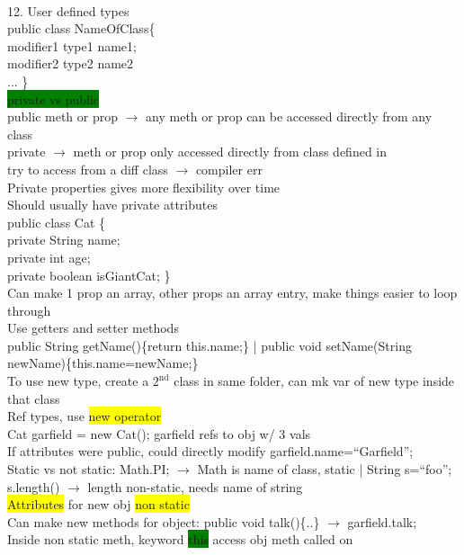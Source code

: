 ~\\ \color{NavyBlue}
12. User defined types
\\public class NameOfClass\{
\\ \phantom{abc}modifier1 type1 name1;
\\ \phantom{abc}modifier2 type2 name2
\\ \phantom{abc}... \}
\\ \colorbox{Green}{private vs public}
\\ public meth or prop $\rightarrow$ any meth or prop can be accessed directly from any class
\\ private $\rightarrow$ meth or prop only accessed directly from class defined in
\\ try to access from a diff class $\rightarrow$ compiler err
\\ Private properties gives more flexibility over time
\\ Should usually have private attributes
\\public class Cat \{
\\\phantom{abc}private String name;
\\\phantom{abc}private int age;
\\\phantom{abc} private boolean isGiantCat; \}
\\ Can make 1 prop an array, other props an array entry, make things easier to loop through
\\ Use getters and setter methods
\\ public String getName()\{return this.name;\} | public void setName(String newName)\{this.name=newName;\}
\\ To use new type, create a $2^{\text{nd}}$ class in same folder, can mk var of new type inside that class
\\ Ref types, use \colorbox{Yellow}{new operator}
\\ Cat garfield = new Cat(); garfield refs to obj w/ 3 vals
\\ If attributes were public, could directly modify garfield.name=``Garfield'';
\\ Static vs not static: Math.PI; $\rightarrow$ Math is name of class, static | String s=``foo''; s.length() $\rightarrow$ length non-static, needs name of string
\\ \colorbox{Yellow}{Attributes} for new obj \colorbox{Yellow}{non static}
\\ Can make new methods for object: public void talk()\{..\} $\rightarrow$ garfield.talk;
\\ Inside non static meth, keyword \colorbox{Green}{this} access obj meth called on

